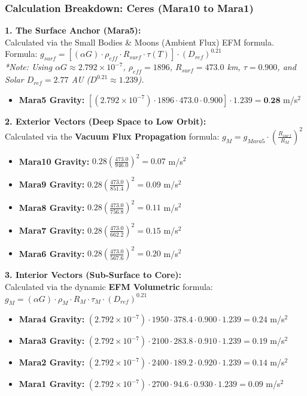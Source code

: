 \documentclass[11pt, a4paper]{article}
\begin{document}
\clearpage
\subsubsection{Calculation Breakdown: Ceres (Mara10 to Mara1)}

\noindent \textbf{1. The Surface Anchor (Mara5):} \\
Calculated via the Small Bodies \& Moons (Ambient Flux) EFM formula. \\
Formula: $g_{surf} = \left[ (\alpha G) \cdot \rho_{eff} \cdot R_{surf} \cdot \tau(T) \right] \cdot (D_{ref})^{0.21}$ \\
\textit{*Note: Using $\alpha G \approx 2.792 \times 10^{-7}$, $\rho_{eff} = 1896$, $R_{surf} = 473.0$ km, $\tau = 0.900$, and Solar $D_{ref} = 2.77$ AU ($D^{0.21} \approx 1.239$).}
\begin{itemize}
  \item \textbf{Mara5 Gravity:} $\left[ (2.792 \times 10^{-7}) \cdot 1896 \cdot 473.0 \cdot 0.900 \right] \cdot 1.239 = \textbf{0.28}$ m/s$^2$
\end{itemize}

\vspace{0.5em}
\noindent \textbf{2. Exterior Vectors (Deep Space to Low Orbit):} \\
Calculated via the \textbf{Vacuum Flux Propagation} formula: $g_M = g_{Mara5} \cdot \left( \frac{R_{surf}}{R_M} \right)^2$
\begin{itemize}
  \item \textbf{Mara10 Gravity:} $0.28 \left( \frac{473.0}{946.0} \right)^2 = 0.07$ m/s$^2$
  \item \textbf{Mara9 Gravity:} $0.28 \left( \frac{473.0}{851.4} \right)^2 = 0.09$ m/s$^2$
  \item \textbf{Mara8 Gravity:} $0.28 \left( \frac{473.0}{756.8} \right)^2 = 0.11$ m/s$^2$
  \item \textbf{Mara7 Gravity:} $0.28 \left( \frac{473.0}{662.2} \right)^2 = 0.15$ m/s$^2$
  \item \textbf{Mara6 Gravity:} $0.28 \left( \frac{473.0}{567.6} \right)^2 = 0.20$ m/s$^2$
\end{itemize}

\vspace{0.5em}
\noindent \textbf{3. Interior Vectors (Sub-Surface to Core):} \\
Calculated via the dynamic \textbf{EFM Volumetric} formula: $g_M = (\alpha G) \cdot \rho_{M} \cdot R_M \cdot \tau_M \cdot (D_{ref})^{0.21}$
\begin{itemize}
  \item \textbf{Mara4 Gravity:} $(2.792 \times 10^{-7}) \cdot 1950 \cdot 378.4 \cdot 0.900 \cdot 1.239 = 0.24$ m/s$^2$
  \item \textbf{Mara3 Gravity:} $(2.792 \times 10^{-7}) \cdot 2100 \cdot 283.8 \cdot 0.910 \cdot 1.239 = 0.19$ m/s$^2$
  \item \textbf{Mara2 Gravity:} $(2.792 \times 10^{-7}) \cdot 2400 \cdot 189.2 \cdot 0.920 \cdot 1.239 = 0.14$ m/s$^2$
  \item \textbf{Mara1 Gravity:} $(2.792 \times 10^{-7}) \cdot 2700 \cdot 94.6 \cdot 0.930 \cdot 1.239 = 0.09$ m/s$^2$
\end{itemize}
\end{document}
